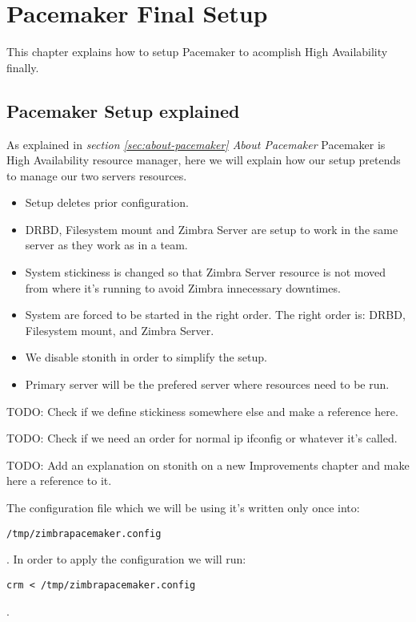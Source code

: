 

\chapter{Pacemaker Final Setup}
This chapter explains how to setup Pacemaker to acomplish High Availability finally.

\section {Pacemaker Setup explained}
As explained in \textit{section \ref{sec:about-pacemaker} About Pacemaker} Pacemaker is High Availability resource manager, here we will explain how our setup pretends to manage our two servers resources.

\begin{itemize}
  \item Setup deletes prior configuration.
  \item DRBD, Filesystem mount and Zimbra Server are setup to work in the same server as they work as in a team.
  \item System stickiness is changed so that Zimbra Server resource is not moved from where it's running to avoid Zimbra innecessary downtimes.
  \item System are forced to be started in the right order. The right order is: DRBD, Filesystem mount, and Zimbra Server.
  \item We disable stonith in order to simplify the setup.
  \item Primary server will be the prefered server where resources need to be run.
\end{itemize}

TODO: Check if we define stickiness somewhere else and make a reference here.

TODO: Check if we need an order for normal ip ifconfig or whatever it's called.

TODO: Add an explanation on stonith on a new Improvements chapter and make here a reference to it.

The configuration file which we will be using it's written only once into:
\begin{verbatim}
/tmp/zimbrapacemaker.config
\end{verbatim}
. In order to apply the configuration we will run:
\begin{verbatim}
crm < /tmp/zimbrapacemaker.config
\end{verbatim}
.

